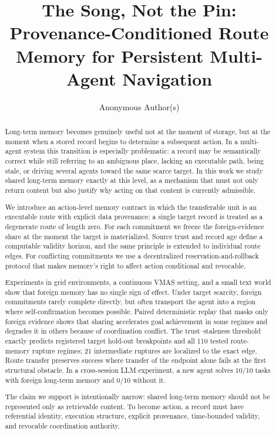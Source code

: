 \documentclass{article}
\title{The Song, Not the Pin: Provenance-Conditioned Route Memory for Persistent Multi-Agent Navigation}
\author{Anonymous Author(s)}
\begin{document}
\maketitle

\begin{abstract}
Long-term memory becomes genuinely useful not at the moment of storage, but at the moment when a stored record begins to determine a subsequent action. In a multi-agent system this transition is especially problematic: a record may be semantically correct while still referring to an ambiguous place, lacking an executable path, being stale, or driving several agents toward the same scarce target. In this work we study shared long-term memory exactly at this level, as a mechanism that must not only return content but also justify why acting on that content is currently admissible.

We introduce an action-level memory contract in which the transferable unit is an executable route with explicit data provenance; a single target record is treated as a degenerate route of length zero. For each commitment we freeze the foreign-evidence share at the moment the target is materialized. Source trust and record age define a computable validity horizon, and the same principle is extended to individual route edges. For conflicting commitments we use a decentralized reservation-and-rollback protocol that makes memory's right to affect action conditional and revocable.

Experiments in grid environments, a continuous VMAS setting, and a small text world show that foreign memory has no single sign of effect. Under target scarcity, foreign commitments rarely complete directly, but often transport the agent into a region where self-confirmation becomes possible. Paired deterministic replay that masks only foreign evidence shows that sharing accelerates goal achievement in some regimes and degrades it in others because of coordination conflict. The trust--staleness threshold exactly predicts registered target hold-out breakpoints and all 110 tested route-memory rupture regimes; 21 intermediate ruptures are localized to the exact edge. Route transfer preserves success where transfer of the endpoint alone fails at the first structural obstacle. In a cross-session LLM experiment, a new agent solves 10/10 tasks with foreign long-term memory and 0/10 without it.

The claim we support is intentionally narrow: shared long-term memory should not be represented only as retrievable content. To become action, a record must have referential identity, execution structure, explicit provenance, time-bounded validity, and revocable coordination authority.
\end{abstract}
\end{document}
